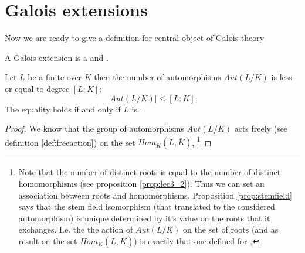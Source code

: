 \section{Galois extensions}

Now we are ready to give a definition for central object of Galois
theory

\begin{definition}
  A Galois extension is a  and
  .
  \label{def:galoisextension}
\end{definition}

\begin{theorem}
  Let $L$ be a finite over $K$ then the number of automorphisms
  $Aut\left(L/K\right)$ is less or equal to degree
  $\left[L:K\right]$:
  \[
  \left|Aut\left(L/K\right)\right| \le \left[L:K\right].
  \]
  The equality holds if and only if $L$ is
  .
  \label{thm:lec5_4}
  \begin{proof}
    We know that the group of automorphisms $Aut\left(L/K\right)$ acts
    freely (see definition \ref{def:freeaction}) on the set
    $Hom_K\left(L, \bar{K}\right)$,
    \footnote{
      Note that the number of distinct roots is equal to the number of
      distinct homomorphisms (see proposition \ref{prop:lec3_2}). Thus
      we can set an association between 
      roots and homomorphisms. Proposition \ref{prop:stemfield}
      says that the stem 
      field isomorphism (that translated to the considered
      automorphism) is unique determined by it's value on the roots that
      it exchanges. I.e. the the action of $Aut\left(L/K\right)$ on
      the set of roots (and as result on the set $Hom_K\left(L,
      \bar{K}\right)$) is exactly that one defined for 
      .

}
\end{proof}
\end{theorem}
